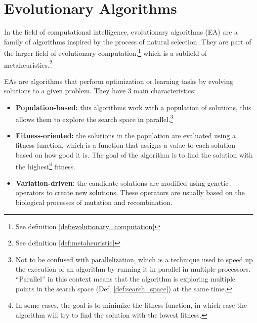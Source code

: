 \section{Evolutionary Algorithms}
\label{sec:evolutionary_algorithms}
  In the field of computational intelligence, evolutionary algorithms (EA)
  \autocite{yuIntroductionEvolutionaryAlgorithms2010} are a family of algorithms inspired by the 
  process of natural selection. 
  They are part of the larger field of evolutionary 
  computation,\footnote{See definition \ref{def:evolutionary_computation}} which is a subfield of 
  metaheuristics.\footnote{See definition \ref{def:metaheuristic}}

  EAs are algorithms that perform optimization or learning tasks by evolving solutions to a given
  problem.
  They have 3 main characteristics:

  \begin{itemize}
    \item \textbf{Population-based:} this algorithms work with a population of solutions, this
      allows them to explore the search space in parallel.\footnote{
        Not to be confused with parallelization, which is a technique used to speed up the execution
        of an algorithm by running it in parallel in multiple processors.
        \enquote{Parallel} in this context means that the algorithm is exploring multiple points in
        the search space (Def. \ref{def:search_space}) at the same time.
      }
    \item \textbf{Fitness-oriented:} the solutions in the population are evaluated using a fitness
      function, which is a function that assigns a value to each solution based on how good it is.
      The goal of the algorithm is to find the solution with the highest\footnote{
        In some cases, the goal is to minimize the fitness function, in which case the algorithm
        will try to find the solution with the lowest fitness.
      } fitness.
    \item \textbf{Variation-driven:} the candidate solutions are modified using genetic operators
      to create new solutions.
      These operators are usually based on the biological processes of mutation and recombination.
  \end{itemize}
